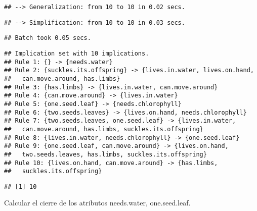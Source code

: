 \documentclass[
]{book}
\newenvironment{Shaded}{\begin{snugshade}}{\end{snugshade}}
\newcommand{\AttributeTok}[1]{\textcolor[rgb]{0.77,0.63,0.00}{#1}}
\newcommand{\DecValTok}[1]{\textcolor[rgb]{0.00,0.00,0.81}{#1}}
\newcommand{\FunctionTok}[1]{\textcolor[rgb]{0.00,0.00,0.00}{#1}}
\newcommand{\NormalTok}[1]{#1}
\newcommand{\OtherTok}[1]{\textcolor[rgb]{0.56,0.35,0.01}{#1}}
\newcommand{\SpecialCharTok}[1]{\textcolor[rgb]{0.00,0.00,0.00}{#1}}
\begin{document}
\begin{verbatim}
## --> Generalization: from 10 to 10 in 0.02 secs.
\end{verbatim}

\begin{verbatim}
## --> Simplification: from 10 to 10 in 0.03 secs.
\end{verbatim}

\begin{verbatim}
## Batch took 0.05 secs.
\end{verbatim}

\begin{Shaded}
\end{Shaded}

\begin{verbatim}
## Implication set with 10 implications.
## Rule 1: {} -> {needs.water}
## Rule 2: {suckles.its.offspring} -> {lives.in.water, lives.on.hand,
##   can.move.around, has.limbs}
## Rule 3: {has.limbs} -> {lives.in.water, can.move.around}
## Rule 4: {can.move.around} -> {lives.in.water}
## Rule 5: {one.seed.leaf} -> {needs.chlorophyll}
## Rule 6: {two.seeds.leaves} -> {lives.on.hand, needs.chlorophyll}
## Rule 7: {two.seeds.leaves, one.seed.leaf} -> {lives.in.water,
##   can.move.around, has.limbs, suckles.its.offspring}
## Rule 8: {lives.in.water, needs.chlorophyll} -> {one.seed.leaf}
## Rule 9: {one.seed.leaf, can.move.around} -> {lives.on.hand,
##   two.seeds.leaves, has.limbs, suckles.its.offspring}
## Rule 10: {lives.on.hand, can.move.around} -> {has.limbs,
##   suckles.its.offspring}
\end{verbatim}

\begin{Shaded}
\end{Shaded}

\begin{verbatim}
## [1] 10
\end{verbatim}

Calcular el cierre de los atributos needs.water, one.seed.leaf.

\begin{Shaded}
\end{Shaded}
\end{document}
